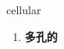 
\begin{frame}
{\huge cellular}
\begin{center}
\begin{enumerate}\Large
  \item \textbf{多孔的}
\end{enumerate}
\end{center}
\end{frame}
